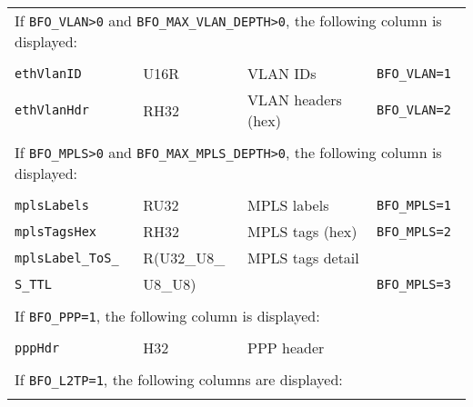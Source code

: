 \documentclass[documentation]{subfiles}
\begin{document}
\begin{longtable}{llll}
    \\ %

    \multicolumn{4}{l}{If {\tt BFO\_VLAN>0} and {\tt BFO\_MAX\_VLAN\_DEPTH>0}, the following column is displayed:}\\\\

    {\tt ethVlanID}  & U16R & VLAN IDs           & {\tt\small BFO\_VLAN=1}\\
    {\tt ethVlanHdr} & RH32 & VLAN headers (hex) & {\tt\small BFO\_VLAN=2}\\\\

    \multicolumn{4}{l}{If {\tt BFO\_MPLS>0} and {\tt BFO\_MAX\_MPLS\_DEPTH>0}, the following column is displayed:}\\\\

    {\tt mplsLabels}       & RU32           & MPLS labels      & {\tt\small BFO\_MPLS=1}\\
    {\tt mplsTagsHex}      & RH32           & MPLS tags (hex)  & {\tt\small BFO\_MPLS=2}\\
    {\tt mplsLabel\_ToS\_} & R(U32\_U8\_    & MPLS tags detail & \\
    {\tt \qquad S\_TTL}    & \qquad U8\_U8) &                  & {\tt\small BFO\_MPLS=3}\\\\

    \multicolumn{4}{l}{If {\tt BFO\_PPP=1}, the following column is displayed:}\\\\

    {\tt pppHdr}  & H32 & PPP header & \\\\

    \multicolumn{4}{l}{If {\tt BFO\_L2TP=1}, the following columns are displayed:}\\\\


\end{longtable}
\end{document}

